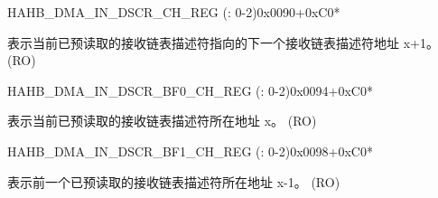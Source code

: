\begin{register}{H}{AHB\_DMA\_IN\_DSCR\_CH\_REG (: 0-2)}{0x0090+0xC0*}\label{regdesc:AHBDMAINDSCRCHNREG}
%
\regnewline%
\begin{regdesc}\begin{reglist}
\label{fielddesc:AHBDMAINLINKDSCRCHN}\item [AHB\_DMA\_INLINK\_DSCR\_CH\regindex{n}] 表示当前已预读取的接收链表描述符指向的下一个接收链表描述符地址 x+1。 (RO)
\end{reglist}\end{regdesc}
\end{register}


\begin{register}{H}{AHB\_DMA\_IN\_DSCR\_BF0\_CH\_REG (: 0-2)}{0x0094+0xC0*}\label{regdesc:AHBDMAINDSCRBF0CHNREG}
%
\regnewline%
\begin{regdesc}\begin{reglist}
\label{fielddesc:AHBDMAINLINKDSCRBF0CHN}\item [AHB\_DMA\_INLINK\_DSCR\_BF0\_CH\regindex{n}] 表示当前已预读取的接收链表描述符所在地址 x。 (RO)
\end{reglist}\end{regdesc}
\end{register}


\begin{register}{H}{AHB\_DMA\_IN\_DSCR\_BF1\_CH\_REG (: 0-2)}{0x0098+0xC0*}\label{regdesc:AHBDMAINDSCRBF1CHNREG}
%
\regnewline%
\begin{regdesc}\begin{reglist}
\label{fielddesc:AHBDMAINLINKDSCRBF1CHN}\item [AHB\_DMA\_INLINK\_DSCR\_BF1\_CH\regindex{n}] 表示前一个已预读取的接收链表描述符所在地址 x-1。 (RO)
\end{reglist}\end{regdesc}
\end{register}


